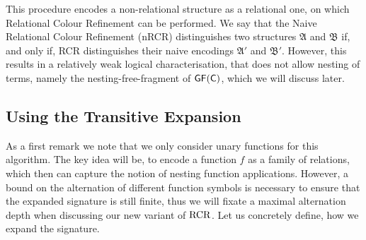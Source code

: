 This procedure encodes a non-relational structure as a relational one, on which Relational Colour Refinement can be performed.
We say that the Naive Relational Colour Refinement (nRCR) distinguishes two structures $\mathfrak A$ and $\mathfrak B$ if, and only if, RCR distinguishes their naive encodings $\mathfrak A'$ and $\mathfrak B'$.
However, this results in a relatively weak logical characterisation, that does not allow nesting of terms, namely the nesting-free-fragment of $\mathsf{GF}(\mathsf{C})$, which we will discuss later.

\subsection{Using the Transitive Expansion} 
\label{sec:TransitiveExpansion}

As a first remark we note that we only consider unary functions for this algorithm.
The key idea will be, to encode a function $f$ as a family of relations, which then can capture the notion of nesting function applications.
However, a bound on the alternation of different function symbols is necessary to ensure that the expanded signature is still finite, thus we will fixate a maximal alternation depth when discussing our new variant of $\operatorname{RCR}$.
Let us concretely define, how we expand the signature.

